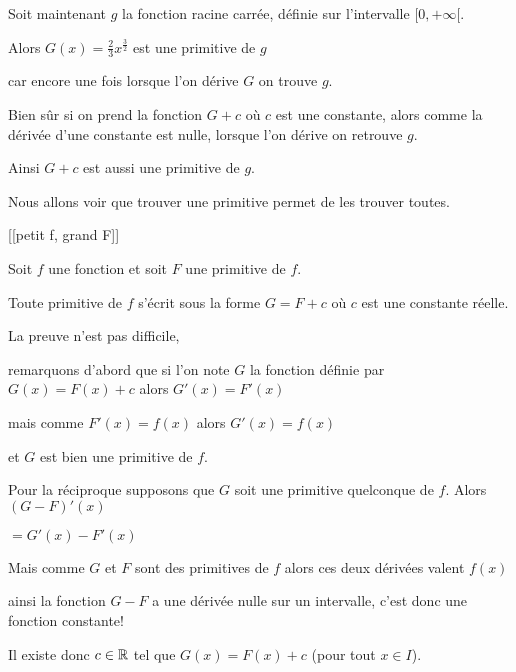 \change

Soit maintenant $g$ la fonction racine carrée, définie sur l'intervalle $[0,+\infty[$.

\change

Alors  $G(x)=\frac{2}{3} x^{\frac{3}{2}}$ est une primitive de $g$

car encore une fois lorsque l'on dérive $G$ on trouve $g$.

\change

Bien sûr si on prend la fonction $G+c$ où $c$ est une constante,
alors comme la dérivée d'une constante est nulle,
lorsque l'on dérive on retrouve $g$.  

Ainsi $G+c$ est aussi une primitive de $g$.


\diapo

Nous allons voir que trouver une primitive permet de les trouver toutes.

[[petit f, grand F]]

Soit $f$ une fonction et soit $F$ une primitive de $f$. 

Toute primitive de $f$ s'écrit sous la forme $G=F+c$ où $c$ est une constante réelle.

\change

La preuve n'est pas difficile,

remarquons d'abord que 
 si l'on note $G$ la fonction définie par $G(x)=F(x)+c$ alors
$G'(x)=F'(x)$ 

\change

mais comme $F'(x)=f(x)$ alors $G'(x)=f(x)$ 

\change

et $G$ est bien une primitive de $f$.

\change

Pour la réciproque supposons que $G$ soit une primitive quelconque de $f$.
Alors $(G-F)'(x)$

\change

$=G'(x)-F'(x)$

Mais comme $G$ et $F$ sont des primitives de $f$ alors ces deux dérivées valent $f(x)$

\change

\change

ainsi la fonction $G-F$ a une dérivée nulle sur un intervalle, c'est donc une fonction constante!

\change

Il existe donc $c\in \mathbb{R}$ tel que $G(x)=F(x)+c$ (pour tout $x\in I$).


